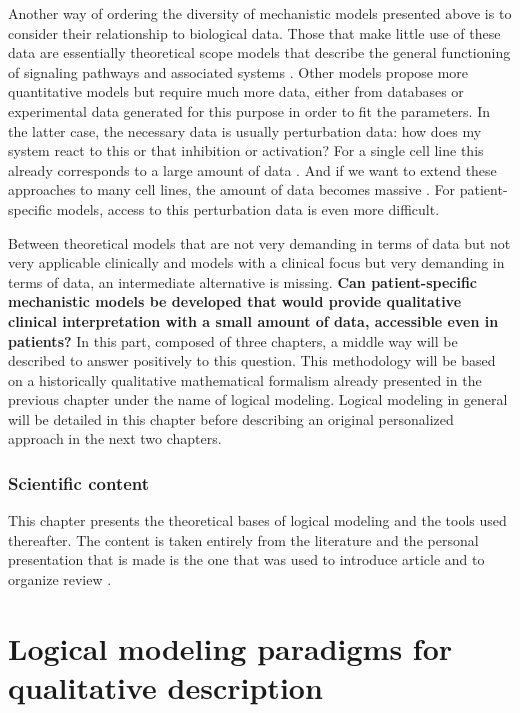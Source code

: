 \documentclass[a4paper,12pt,twoside,onecolumn,openright,final,oldfontcommands]{memoir}
\newcommand{\initial}[1]{
	\lettrine[lines=3,lhang=0.33,nindent=0em]{
		\color{gray}
     		{\textsc{#1}}}{}}
\let\BeginKnitrBlock\begin \let\EndKnitrBlock\end
\begin{document}
\initial{A}nother way of ordering the diversity of mechanistic models
presented above is to consider their relationship to biological data.
Those that make little use of these data are essentially theoretical
scope models that describe the general functioning of signaling pathways
and associated systems \citep{calzone2010mathematical}. Other models
propose more quantitative models but require much more data, either from
databases or experimental data generated for this purpose in order to
fit the parameters. In the latter case, the necessary data is usually
perturbation data: how does my system react to this or that inhibition
or activation? For a single cell line this already corresponds to a
large amount of data \citep{razzaq2018computational}. And if we want to
extend these approaches to many cell lines, the amount of data becomes
massive \citep{frohlich2018efficient}. For patient-specific models,
access to this perturbation data is even more difficult.

Between theoretical models that are not very demanding in terms of data
but not very applicable clinically and models with a clinical focus but
very demanding in terms of data, an intermediate alternative is missing.
\textbf{Can patient-specific mechanistic models be developed that would
provide qualitative clinical interpretation with a small amount of data,
accessible even in patients?} In this part, composed of three chapters,
a middle way will be described to answer positively to this question.
This methodology will be based on a historically qualitative
mathematical formalism already presented in the previous chapter under
the name of logical modeling. Logical modeling in general will be
detailed in this chapter before describing an original personalized
approach in the next two chapters.

\BeginKnitrBlock{summarybox}
\subsubsection*{Scientific content}\label{scientific-content-1}

This chapter presents the theoretical bases of logical modeling and the
tools used thereafter. The content is taken entirely from the literature
and the personal presentation that is made is the one that was used to
introduce article \citet{beal2019personalization} and to organize review
\citet{beal2020modelisation}.
\EndKnitrBlock{summarybox}

\section{Logical modeling paradigms for qualitative
description}\label{logical-modeling-paradigms-for-qualitative-description}
\end{document}
